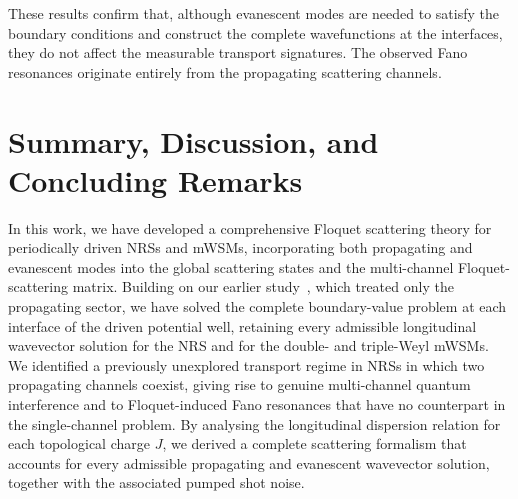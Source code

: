 \documentclass[aps,prb,onecolumn,longbibliography,nofootinbib,citeautoscript,10pt]{revtex4-2}
\begin{document}
These results confirm that, although evanescent modes are needed to satisfy the boundary conditions and construct the complete wavefunctions at the interfaces, they do not affect the measurable transport signatures. The observed Fano resonances originate entirely from the propagating scattering channels.


\section{Summary, Discussion, and Concluding Remarks}\label{sec:summary}

In this work, we have developed a comprehensive Floquet scattering theory for periodically driven NRSs and mWSMs, incorporating both propagating and evanescent modes into the global scattering states and the multi-channel Floquet-scattering matrix. Building on our earlier study~\cite{bera2023},  which treated only the propagating sector, we have solved the complete boundary-value problem at each interface of the driven potential well, retaining every admissible longitudinal wavevector solution for the NRS and for the double- and triple-Weyl mWSMs. We identified a previously unexplored transport regime in NRSs in which two propagating channels coexist, giving rise to genuine multi-channel quantum interference and to Floquet-induced Fano resonances that have no counterpart in the single-channel problem. By analysing the longitudinal dispersion relation for each topological charge $J$, we derived a complete scattering formalism that accounts for every admissible propagating and evanescent wavevector solution, together with the associated pumped shot noise.
\end{document}
